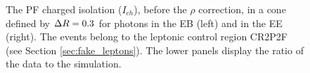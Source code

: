\begin{figure}
  \centering
  \hfill
  \hfill
  \hfill\mbox{}
\caption{The PF charged isolation ($I_{ch}$), before the $\rho$ correction, in a cone defined by $\Delta R = 0.3$ for photons in the EB (left) and in the EE (right).
The events belong to the leptonic control region CR2P2F (see Section \ref{sec:fake_leptons}).
The lower panels display the ratio of the data to the simulation.}
\label{fig:chIso_CR2P2F}
\end{figure}


